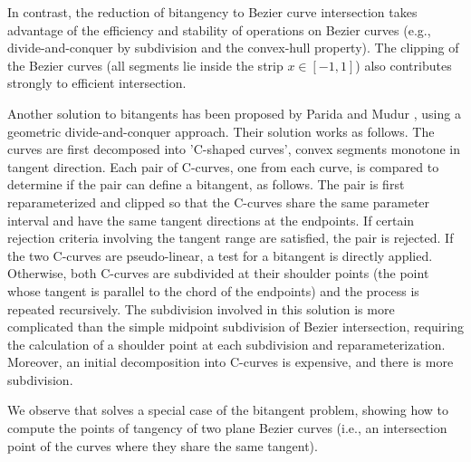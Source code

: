 \documentclass[12pt]{article}
\begin{document}
In contrast, the reduction of bitangency to Bezier curve intersection
takes advantage of the efficiency and stability of operations 
on Bezier curves (e.g., divide-and-conquer by subdivision and the convex-hull
property).
The clipping of the Bezier curves (all segments lie inside the strip 
$x \in [-1,1]$) also contributes strongly to efficient intersection.


Another solution to bitangents has been proposed by 
Parida and Mudur \cite{parida95}, using a geometric divide-and-conquer approach.
Their solution works as follows.
The curves are first decomposed into 'C-shaped curves', convex segments
monotone in tangent direction.
Each pair of C-curves, one from each curve, is compared to determine
if the pair can define a bitangent, as follows.
The pair is first reparameterized and clipped so that the C-curves
share the same parameter interval and have the same tangent directions at the endpoints. 
If certain rejection criteria involving the tangent range are satisfied,
the pair is rejected.
If the two C-curves are pseudo-linear, a test for a bitangent is
directly applied.
Otherwise, both C-curves are subdivided at their shoulder points (the point
whose tangent is parallel to the chord of the endpoints) and the process
is repeated recursively.
The subdivision involved in this solution is more complicated than the
simple midpoint subdivision of Bezier intersection,
requiring the calculation of a shoulder point at each subdivision
and reparameterization.
Moreover, an initial decomposition into C-curves is expensive, and 
there is more subdivision.


We observe that \cite{sederberg90} solves a special case of the 
bitangent problem, showing how to compute the points of tangency of two plane Bezier curves
(i.e., an intersection point of the curves where they share the same tangent).
\end{document}
